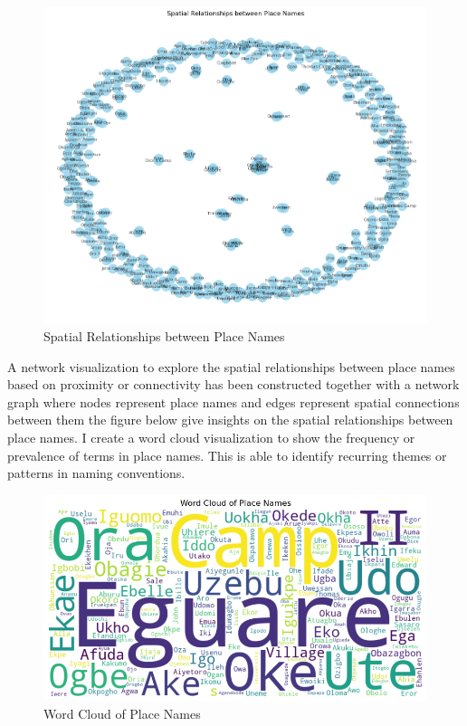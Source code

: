 \begin{figure}
    \centering
    \includegraphics[width=1\linewidth]{networkanalysis.png}
    \caption{Spatial Relationships between Place Names}
    \label{fig:network}
\end{figure}
A network visualization to explore the spatial relationships between place names based on proximity or connectivity has been constructed together with a network graph where nodes represent place names and edges represent spatial connections between them the figure below give insights on the spatial relationships between place names.
\newpage
I create a word cloud visualization to show the frequency or prevalence of terms in place names. This is able to identify recurring themes or patterns in naming conventions.
\begin{figure}
    \centering
    \includegraphics[width=1\linewidth]{wordcloud.png}
    \caption{Word Cloud of Place Names}
    \label{fig:wordcloud}
\end{figure}
